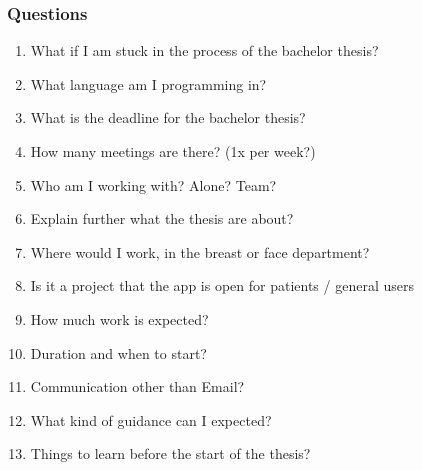 \documentclass{article}
\begin{document}
\subsubsection*{Questions}

\begin{enumerate}[label=\textbf{\arabic*.}]
    \item What if I am stuck in the process of the bachelor thesis?
    \item What language am I programming in?
    \item What is the deadline for the bachelor thesis?
    \item How many meetings are there? (1x per week?)
    \item Who am I working with? Alone? Team?
    \item Explain further what the thesis are about?
    \item Where would I work, in the breast or face department?
    \item Is it a project that the app is open for patients / general users
    \item How much work is expected?
    \item Duration and when to start?
    \item Communication other than Email?
    \item What kind of guidance can I expected?
    \item Things to learn before the start of the thesis?







\end{enumerate}
\end{document}
